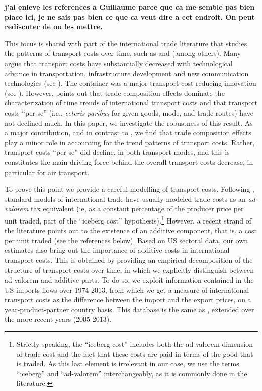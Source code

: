 \documentclass[a4paper,11pt]{article}
\begin{document}
\textbf{j'ai enleve les references a Guillaume parce que ca me semble pas bien place ici, je ne sais pas bien ce que ca veut dire a cet endroit. On peut rediscuter de ou les mettre.}

This focus is shared with part of the international trade literature that studies the patterns of transport costs over time, such as \cite{hummels2007} and \cite{Behar_Venables} (among others). Many argue that transport costs have substantially decreased with technological advance in transportation, infrastructure development and new communication technologies (see \citealp{Lafourcade_Thisse}). %
The container was a major transport-cost reducing innovation (see \citealp{levinson2016box}). However, \cite{hummels2007} points out that trade composition effects dominate the characterization of time trends of international transport costs and that transport costs ``per se'' (i.e., \textit{ceteris paribus} for given goods, mode, and trade routes) have not declined much. In this paper, we investigate the robustness of this result. As a major contribution, and in contrast to \cite{hummels2007}, we find that trade composition effects play a minor role in accounting for the trend patterns of transport costs. Rather, transport costs ``per se'' did decline, in both transport modes, and this is constitutes the main driving force behind the overall transport costs decrease, in particular for air transport.\medskip

To prove this point we provide a careful modelling of transport costs. Following \citet{samuelson1954}, standard models of international trade have usually modeled trade costs as an \emph{ad-valorem} tax equivalent (ie, as a constant percentage of the producer price per unit traded, part of the ``iceberg cost'' hypothesis).\footnote{Strictly speaking, the ``iceberg cost'' includes both the ad-valorem dimension of trade cost and the fact that these costs are paid in terms of the good that is traded. As this last element is irrelevant in our case, we use the terms ``iceberg'' and ``ad-valorem'' interchangeably, as it is commonly done in the literature.} However, a recent strand of the literature points out to the existence of an additive component, that is, a cost per unit traded (see the references below). Based on US sectoral data, our own estimates also bring out the importance of additive costs in international transport costs. This is obtained by providing an empirical decomposition of the structure of transport costs over time, in which we explicitly distinguish between ad-valorem and additive parts. To do so, we exploit information contained in the US imports flows over 1974-2013, from which we get a measure of international transport costs as the difference between the import and the export prices, on a year-product-partner country basis. This database is the same as \cite{hummels2007}, extended over the more recent years (2005-2013). \smallskip
\end{document}

